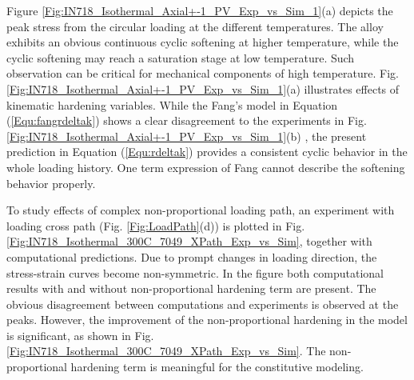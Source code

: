 \documentclass[preprint,5p,twocolumn,11pt,sort&compress]{elsarticle}
\begin{document}
Figure \ref{Fig:IN718_Isothermal_Axial+-1_PV_Exp_vs_Sim_1}(a) depicts the peak stress from the circular loading at the different temperatures.
The alloy exhibits an obvious continuous cyclic softening at higher temperature, while the cyclic softening may reach a saturation stage at low temperature. Such observation can be critical for mechanical components of high temperature.
Fig. \ref{Fig:IN718_Isothermal_Axial+-1_PV_Exp_vs_Sim_1}(a) illustrates effects of kinematic hardening variables. While the Fang's model  \cite{fang2015cyclic}  in Equation (\ref{Equ:fangrdeltak}) shows a clear disagreement to the experiments in Fig. \ref{Fig:IN718_Isothermal_Axial+-1_PV_Exp_vs_Sim_1}(b) , the present prediction in Equation (\ref{Equ:rdeltak}) provides a consistent cyclic behavior in the whole loading history. One term expression of Fang cannot describe the softening behavior properly.

\begin{figure*}[!htp]
\caption{Comparison of the peak stress under isothermal circular non-proportional loading conditions at 300$^{\circ}$C, 550$^{\circ}$C and 650$^{\circ}$C, respectively. (a) The presented model. (b) Fang's model  \cite{fang2015cyclic} .}
\label{Fig:IN718_Isothermal_Axial+-1_PV_Exp_vs_Sim_1}
\end{figure*}

To study effects of complex non-proportional loading path, an experiment with loading cross path (Fig. \ref{Fig:LoadPath}(d)) is plotted in Fig. \ref{Fig:IN718_Isothermal_300C_7049_XPath_Exp_vs_Sim}, together with computational predictions. Due to prompt changes in loading direction, the stress-strain curves become non-symmetric. In the figure both computational results with and without non-proportional hardening term are present. The obvious disagreement between computations and experiments is observed at the peaks. However, the improvement of the non-proportional hardening in the model is significant, as shown in Fig. \ref{Fig:IN718_Isothermal_300C_7049_XPath_Exp_vs_Sim}. The non-proportional hardening term is meaningful for the constitutive modeling.
\end{document}

